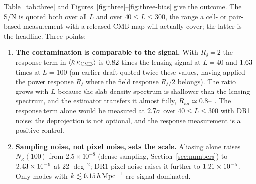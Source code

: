 \documentclass[11pt,a4paper]{article}
\newcommand{\kcmb}{\kappa_{\rm CMB}}
\begin{document}
Table~\ref{tab:three} and Figures~\ref{fig:three}--\ref{fig:three-bias} give the outcome. The S/N is quoted both over all $L$ and over $40\le L\le300$, the range a cell- or pair-based measurement with a released CMB map will actually cover; the latter is the headline. Three points:
\begin{enumerate}
\item \textbf{The contamination is comparable to the signal.} With $R_\delta=2$ the response term in $\langle\hat\kappa\,\kcmb\rangle$ is $0.82$ times the lensing signal at $L=40$ and $1.63$ times at $L=100$ (an earlier draft quoted twice these values, having applied the power response $R_\delta$ where the field response $R_\delta/2$ belongs). The ratio grows with $L$ because the slab density spectrum is shallower than the lensing spectrum, and the estimator transfers it almost fully, $R_{\kappa a}\simeq0.8$--$1$. The response term alone would be measured at $2.7\sigma$ over $40\le L\le300$ with DR1 noise: the deprojection is not optional, and the response measurement is a positive control.
\item \textbf{Sampling noise, not pixel noise, sets the scale.} Aliasing alone raises $N_\kappa(100)$ from $2.5\times10^{-8}$ (dense sampling, Section~\ref{sec:numbers}) to $2.43\times10^{-6}$ at $22$~deg$^{-2}$; DR1 pixel noise raises it further to $1.21\times10^{-5}$. Only modes with $k\lesssim0.15\,h\,{\rm Mpc}^{-1}$ are signal dominated.

\end{enumerate}
\end{document}
